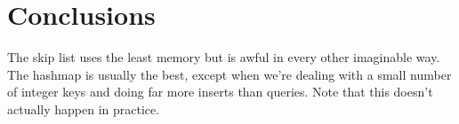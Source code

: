 \documentclass[12pt,a4paper]{article}
\begin{document}
    \section{Conclusions}

    The skip list uses the least memory but is awful in every other imaginable way.  The hashmap is
    usually the best, except when we're dealing with a small number of integer keys and doing far more
    inserts than queries.  Note that this doesn't actually happen in practice.

    

    
\end{document}
